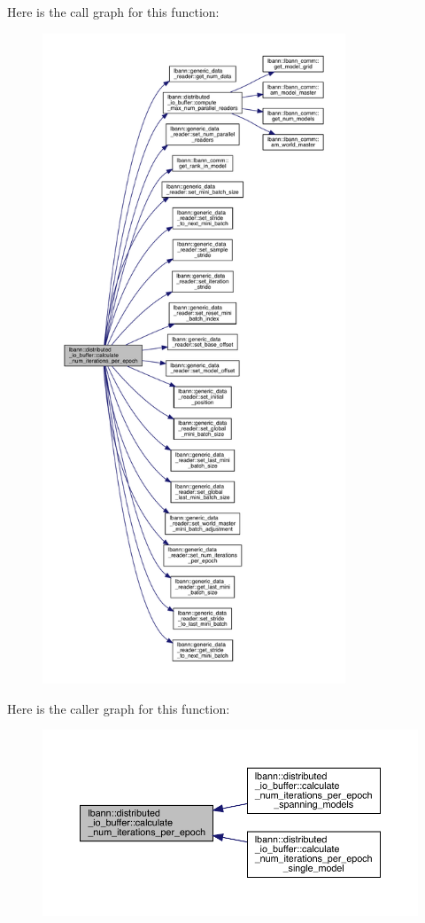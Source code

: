 Here is the call graph for this function\+:\nopagebreak
\begin{figure}[H]
\begin{center}
\leavevmode
\includegraphics[height=550pt]{classlbann_1_1distributed__io__buffer_af63a8b162ed869393c5b604c5913c631_cgraph}
\end{center}
\end{figure}
Here is the caller graph for this function\+:\nopagebreak
\begin{figure}[H]
\begin{center}
\leavevmode
\includegraphics[width=350pt]{classlbann_1_1distributed__io__buffer_af63a8b162ed869393c5b604c5913c631_icgraph}
\end{center}
\end{figure}
